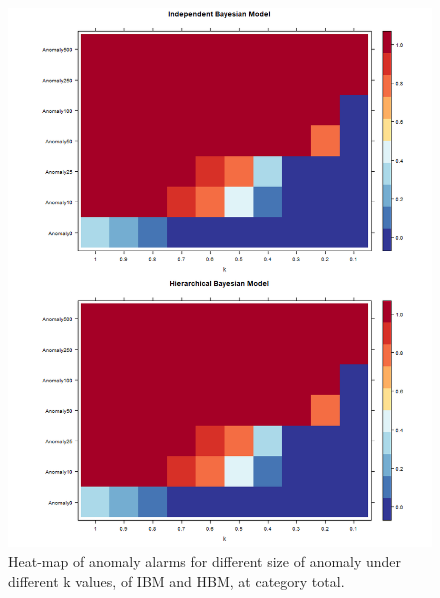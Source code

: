 \begin{figure}[!h]
	\centering
	\includegraphics[width=1\linewidth]{../../R-codes/JAGS/plots/sim1/heattotal}
	\caption{Heat-map of anomaly alarms for different size of anomaly under different k values, of IBM and HBM, at category total.}
	\label{fig:heattotalab}
\end{figure}

\newpage

